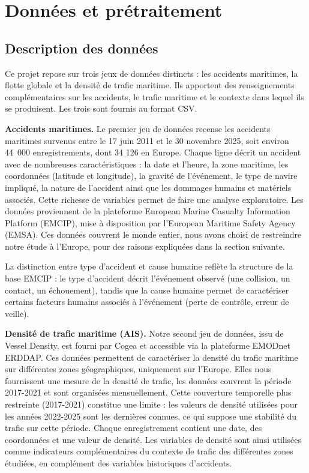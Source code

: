 \documentclass[12pt, a4paper]{report}
\begin{document}
\chapter{Données et prétraitement}

\section{Description des données}

Ce projet repose sur trois jeux de données distincts : les accidents maritimes, la flotte globale et la densité de trafic maritime. Ils apportent des renseignements complémentaires sur les accidents, le trafic maritime et le contexte dans lequel ils se produisent. Les trois sont fournis au format CSV.

\textbf{Accidents maritimes.} Le premier jeu de données recense les accidents maritimes survenus entre le 17 juin 2011 et le 30 novembre 2025, soit environ 44~000 enregistrements, dont 34 126 en Europe. Chaque ligne décrit un accident avec de nombreuses caractéristiques : la date et l'heure, la zone maritime, les coordonnées (latitude et longitude), la gravité de l'événement, le type de navire impliqué, la nature de l'accident ainsi que les dommages humains et matériels associés. Cette richesse de variables permet de faire une analyse exploratoire. Les données proviennent de la plateforme European Marine Casualty Information Platform (EMCIP), mise à disposition par l'European Maritime Safety Agency (EMSA). Ces données couvrent le monde entier, nous avons choisi de restreindre notre étude à l'Europe, pour des raisons expliquées dans la section suivante.

La distinction entre type d'accident et cause humaine reflète la structure de la base EMCIP : le type d'accident décrit l'événement observé (une collision, un contact, un échouement), tandis que la cause humaine permet de caractériser certains facteurs humains associés à l'événement (perte de contrôle, erreur de veille).

\textbf{Densité de trafic maritime (AIS).} Notre second jeu de données, issu de Vessel Density, est fourni par Cogea et accessible via la plateforme EMODnet ERDDAP. Ces données permettent de caractériser la densité du trafic maritime sur différentes zones géographiques, uniquement sur l'Europe. Elles nous fournissent une mesure de la densité de trafic, les données couvrent la période 2017-2021 et sont organisées mensuellement. Cette couverture temporelle plus restreinte (2017-2021) constitue une limite : les valeurs de densité utilisées pour les années 2022-2025 sont les dernières connues, ce qui suppose une stabilité du trafic sur cette période. Chaque enregistrement contient une date, des coordonnées et une valeur de densité. Les variables de densité sont ainsi utilisées comme indicateurs complémentaires du contexte de trafic des différentes zones étudiées, en complément des variables historiques d'accidents.
\end{document}
